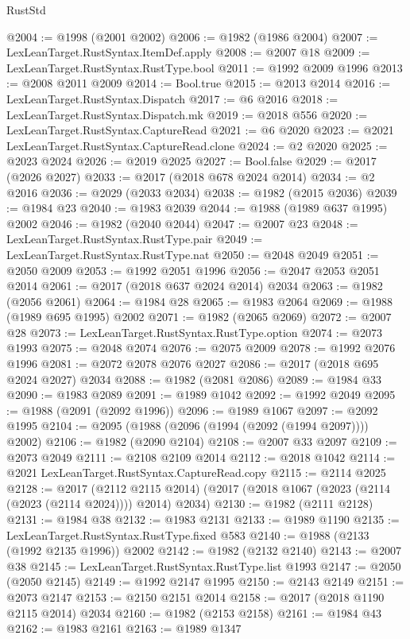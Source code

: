 \begin{lexlean}{RustStd}
\begin{coremodule}
@2004 := @1998 (@2001 @2002)
@2006 := @1982 (@1986 @2004)
@2007 := LexLeanTarget.RustSyntax.ItemDef.apply
@2008 := @2007 @18
@2009 := LexLeanTarget.RustSyntax.RustType.bool
@2011 := @1992 @2009 @1996
@2013 := @2008 @2011 @2009
@2014 := Bool.true
@2015 := @2013 @2014
@2016 := LexLeanTarget.RustSyntax.Dispatch
@2017 := @6 @2016
@2018 := LexLeanTarget.RustSyntax.Dispatch.mk
@2019 := @2018 @556
@2020 := LexLeanTarget.RustSyntax.CaptureRead
@2021 := @6 @2020
@2023 := @2021 LexLeanTarget.RustSyntax.CaptureRead.clone
@2024 := @2 @2020
@2025 := @2023 @2024
@2026 := @2019 @2025
@2027 := Bool.false
@2029 := @2017 (@2026 @2027)
@2033 := @2017 (@2018 @678 @2024 @2014)
@2034 := @2 @2016
@2036 := @2029 (@2033 @2034)
@2038 := @1982 (@2015 @2036)
@2039 := @1984 @23
@2040 := @1983 @2039
@2044 := @1988 (@1989 @637 @1995) @2002
@2046 := @1982 (@2040 @2044)
@2047 := @2007 @23
@2048 := LexLeanTarget.RustSyntax.RustType.pair
@2049 := LexLeanTarget.RustSyntax.RustType.nat
@2050 := @2048 @2049
@2051 := @2050 @2009
@2053 := @1992 @2051 @1996
@2056 := @2047 @2053 @2051 @2014
@2061 := @2017 (@2018 @637 @2024 @2014) @2034
@2063 := @1982 (@2056 @2061)
@2064 := @1984 @28
@2065 := @1983 @2064
@2069 := @1988 (@1989 @695 @1995) @2002
@2071 := @1982 (@2065 @2069)
@2072 := @2007 @28
@2073 := LexLeanTarget.RustSyntax.RustType.option
@2074 := @2073 @1993
@2075 := @2048 @2074
@2076 := @2075 @2009
@2078 := @1992 @2076 @1996
@2081 := @2072 @2078 @2076 @2027
@2086 := @2017 (@2018 @695 @2024 @2027) @2034
@2088 := @1982 (@2081 @2086)
@2089 := @1984 @33
@2090 := @1983 @2089
@2091 := @1989 @1042
@2092 := @1992 @2049
@2095 := @1988 (@2091 (@2092 @1996))
@2096 := @1989 @1067
@2097 := @2092 @1995
@2104 := @2095 (@1988 (@2096 (@1994 (@2092 (@1994 @2097)))) @2002)
@2106 := @1982 (@2090 @2104)
@2108 := @2007 @33 @2097
@2109 := @2073 @2049
@2111 := @2108 @2109 @2014
@2112 := @2018 @1042
@2114 := @2021 LexLeanTarget.RustSyntax.CaptureRead.copy
@2115 := @2114 @2025
@2128 := @2017
    (@2112 @2115 @2014)
    (@2017 (@2018 @1067 (@2023 (@2114 (@2023 (@2114 @2024)))) @2014) @2034)
@2130 := @1982 (@2111 @2128)
@2131 := @1984 @38
@2132 := @1983 @2131
@2133 := @1989 @1190
@2135 := LexLeanTarget.RustSyntax.RustType.fixed @583
@2140 := @1988 (@2133 (@1992 @2135 @1996)) @2002
@2142 := @1982 (@2132 @2140)
@2143 := @2007 @38
@2145 := LexLeanTarget.RustSyntax.RustType.list @1993
@2147 := @2050 (@2050 @2145)
@2149 := @1992 @2147 @1995
@2150 := @2143 @2149
@2151 := @2073 @2147
@2153 := @2150 @2151 @2014
@2158 := @2017 (@2018 @1190 @2115 @2014) @2034
@2160 := @1982 (@2153 @2158)
@2161 := @1984 @43
@2162 := @1983 @2161
@2163 := @1989 @1347

\end{coremodule}
\end{lexlean}
